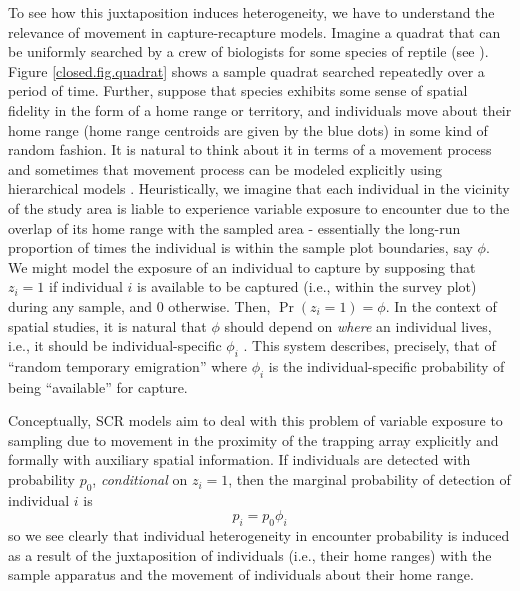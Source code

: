 To see how this juxtaposition induces heterogeneity, we have to
understand the relevance of movement in capture-recapture models.
Imagine a quadrat that can be uniformly searched by a crew of
biologists for some species of reptile (see
\citet{royle_young:2008}).  Figure \ref{closed.fig.quadrat} shows a 
sample quadrat searched repeatedly over a period of time. Further,
suppose that species exhibits some sense of spatial fidelity in the
form of a home range or territory, and individuals move about their
home range (home range centroids are given by the blue dots) in some
kind of random fashion.  It is natural to think about it in terms of a
movement process and sometimes that movement process can be modeled
explicitly using hierarchical models \citep{royle_young:2008,
  royle_etal:2011}.  Heuristically, we imagine that each individual in
the vicinity of the study area is liable to experience variable
exposure to encounter due to the overlap of its home range with the
sampled area - essentially the long-run proportion of times the
individual is within the sample plot boundaries, say $\phi$. We
might model the exposure of an individual to capture by supposing that
$z_{i} = 1$ if individual $i$ is available to be captured (i.e.,
within the survey plot) during any sample, and $0$ otherwise. Then,
$\Pr(z_{i}=1) = \phi$.  In the context of spatial studies, it is
natural that $\phi$ should depend on {\it where} an individual lives,
i.e., it should be individual-specific $\phi_{i}$
\citep{chandler_etal:2011}. This system describes, precisely, that of
``random temporary emigration'' \citep{kendall_etal:1997} where $\phi_{i}$
is the individual-specific probability of being ``available'' for
capture.  

Conceptually, SCR models aim to deal with
this problem of variable exposure to sampling due to movement in the
proximity of the trapping array explicitly and formally with auxiliary
spatial information.  If individuals are detected with probability
$p_{0}$, {\it conditional} on $z_{i} = 1$, then the marginal
probability of detection of individual $i$ is
\[
 p_{i} = p_{0}\phi_{i}
\]
so we see clearly that individual heterogeneity in encounter
probability is induced as a result of the juxtaposition of individuals
(i.e., their home ranges) with the sample apparatus and the movement
of individuals about their home range.

